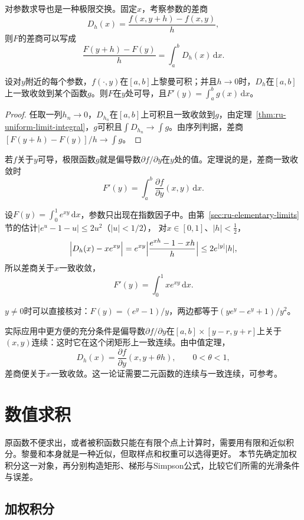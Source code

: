 对参数求导也是一种极限交换。固定$x$，考察参数的差商
\[
 D_h(x)=\frac{f(x,y+h)-f(x,y)}h,
\]
则$F$的差商可以写成
\[
 \frac{F(y+h)-F(y)}h=\int_a^bD_h(x)\,\mathrm dx.
\]
\begin{theorem}[积分号下求导]
\label{thm:ru-differentiation-under-integral}
设对$y$附近的每个参数，$f(\cdot,y)$在$[a,b]$上黎曼可积；并且$h\to0$时，$D_h$在$[a,b]$上一致收敛到某个函数$g$。则$F$在$y$处可导，且$F'(y)=\int_a^bg(x)\,\mathrm dx$。
\end{theorem}
\begin{proof}
任取一列$h_n\to0$，$D_{h_n}$在$[a,b]$上可积且一致收敛到$g$，由定理~\ref{thm:ru-uniform-limit-integral}，$g$可积且$\int D_{h_n}\to\int g$。由序列判据，差商$[F(y+h)-F(y)]/h\to\int g$。
\end{proof}
若$f$关于$y$可导，极限函数$g$就是偏导数$\partial f/\partial y$在$y$处的值。定理说的是，差商一致收敛时
\[
 F'(y)=\int_a^b\frac{\partial f}{\partial y}(x,y)\,\mathrm dx.
\]
\begin{example}
\label{ex:ru-differentiate-exp-parametric}
设$F(y)=\int_0^1e^{xy}\,\mathrm dx$，参数只出现在指数因子中。由第~\ref{sec:ru-elementary-limits}节的估计$|e^u-1-u|\leq2u^2$（$|u|<1/2$），
对$x\in[0,1]$、$|h|<\tfrac12$，
\[
 \Bigl|D_h(x)-xe^{xy}\Bigr|=e^{xy}\Bigl|\frac{e^{xh}-1-xh}h\Bigr|\leq2e^{|y|}|h|,
\]
所以差商关于$x$一致收敛，
\[
 F'(y)=\int_0^1xe^{xy}\,\mathrm dx.
\]

$y\neq0$时可以直接核对：$F(y)=(e^y-1)/y$，两边都等于$(ye^y-e^y+1)/y^2$。
\end{example}
实际应用中更方便的充分条件是偏导数$\partial f/\partial y$在$[a,b]\times[y-r,y+r]$上关于$(x,y)$连续：这时它在这个闭矩形上一致连续。由中值定理，
\[
 D_h(x)=\frac{\partial f}{\partial y}(x,y+\theta h),\qquad0<\theta<1,
\]
差商便关于$x$一致收敛。这一论证需要二元函数的连续与一致连续，可参考。
\section{数值求积}
\label{sec:ru-numerical-quadrature}

原函数不便求出，或者被积函数只能在有限个点上计算时，需要用有限和近似积分。黎曼和本身就是一种近似，但取样点和权重可以选得更好。
本节先确定加权积分这一对象，再分别构造矩形、梯形与Simpson公式，比较它们所需的光滑条件与误差。

\subsection{加权积分}
\label{sec:ru-weighted-integrals}

